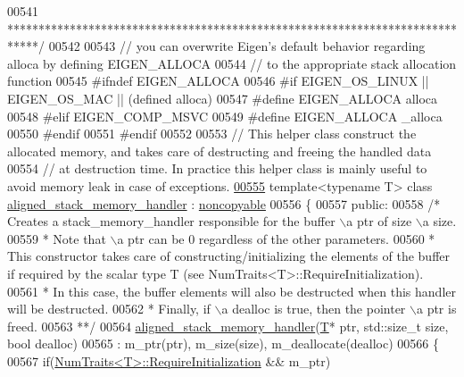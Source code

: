 \begin{DoxyCode}
00541 \textcolor{comment}{*****************************************************************************/}
00542 
00543 \textcolor{comment}{// you can overwrite Eigen's default behavior regarding alloca by defining EIGEN\_ALLOCA}
00544 \textcolor{comment}{// to the appropriate stack allocation function}
00545 \textcolor{preprocessor}{#ifndef EIGEN\_ALLOCA}
00546 \textcolor{preprocessor}{  #if EIGEN\_OS\_LINUX || EIGEN\_OS\_MAC || (defined alloca)}
00547 \textcolor{preprocessor}{    #define EIGEN\_ALLOCA alloca}
00548 \textcolor{preprocessor}{  #elif EIGEN\_COMP\_MSVC}
00549 \textcolor{preprocessor}{    #define EIGEN\_ALLOCA \_alloca}
00550 \textcolor{preprocessor}{  #endif}
00551 \textcolor{preprocessor}{#endif}
00552 
00553 \textcolor{comment}{// This helper class construct the allocated memory, and takes care of destructing and freeing the handled
       data}
00554 \textcolor{comment}{// at destruction time. In practice this helper class is mainly useful to avoid memory leak in case of
       exceptions.}
\hyperlink{class_eigen_1_1internal_1_1aligned__stack__memory__handler}{00555} \textcolor{keyword}{template}<\textcolor{keyword}{typename} T> \textcolor{keyword}{class }\hyperlink{class_eigen_1_1internal_1_1aligned__stack__memory__handler}{aligned\_stack\_memory\_handler} : 
      \hyperlink{class_eigen_1_1internal_1_1noncopyable}{noncopyable}
00556 \{
00557   \textcolor{keyword}{public}:
00558     \textcolor{comment}{/* Creates a stack\_memory\_handler responsible for the buffer \(\backslash\)a ptr of size \(\backslash\)a size.}
00559 \textcolor{comment}{     * Note that \(\backslash\)a ptr can be 0 regardless of the other parameters.}
00560 \textcolor{comment}{     * This constructor takes care of constructing/initializing the elements of the buffer if required by
       the scalar type T (see NumTraits<T>::RequireInitialization).}
00561 \textcolor{comment}{     * In this case, the buffer elements will also be destructed when this handler will be destructed.}
00562 \textcolor{comment}{     * Finally, if \(\backslash\)a dealloc is true, then the pointer \(\backslash\)a ptr is freed.}
00563 \textcolor{comment}{     **/}
00564     \hyperlink{class_eigen_1_1internal_1_1aligned__stack__memory__handler}{aligned\_stack\_memory\_handler}(\hyperlink{group___sparse_core___module}{T}* ptr, std::size\_t size, \textcolor{keywordtype}{bool} dealloc)
00565       : m\_ptr(ptr), m\_size(size), m\_deallocate(dealloc)
00566     \{
00567       \textcolor{keywordflow}{if}(\hyperlink{group___core___module_struct_eigen_1_1_num_traits}{NumTraits<T>::RequireInitialization} && m\_ptr)

\end{DoxyCode}
